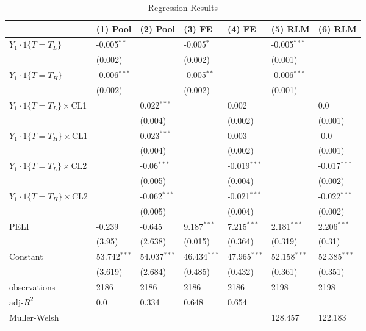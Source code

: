 \documentclass[12pt]{article}
\begin{document}
\begin{table}
    \caption{Regression Results}
    \vspace*{12pt}
    \centering

      \begin{tabular}{lllllll}
\hline
 & (1) Pool & (2) Pool & (3) FE & (4) FE & (5) RLM & (6) RLM \\
\hline
$Y_1\cdot1\{T=T_L\}$ & -0.005$^{**}$ &  & -0.005$^{*}$ &  & -0.005$^{***}$ &  \\
 & (0.002) &  & (0.002) &  & (0.001) &  \\
$Y_1\cdot1\{T=T_H\}$ & -0.006$^{***}$ &  & -0.005$^{**}$ &  & -0.006$^{***}$ &  \\
 & (0.002) &  & (0.002) &  & (0.001) &  \\
$Y_1\cdot1\{T=T_L\}\times$CL1 &  & 0.022$^{***}$ &  & 0.002 &  & 0.0 \\
 &  & (0.004) &  & (0.002) &  & (0.001) \\
$Y_1\cdot1\{T=T_H\}\times$CL1 &  & 0.023$^{***}$ &  & 0.003 &  & -0.0 \\
 &  & (0.004) &  & (0.002) &  & (0.001) \\
$Y_1\cdot1\{T=T_L\}\times$CL2 &  & -0.06$^{***}$ &  & -0.019$^{***}$ &  & -0.017$^{***}$ \\
 &  & (0.005) &  & (0.004) &  & (0.002) \\
$Y_1\cdot1\{T=T_H\}\times$CL2 &  & -0.062$^{***}$ &  & -0.021$^{***}$ &  & -0.022$^{***}$ \\
 &  & (0.005) &  & (0.004) &  & (0.002) \\
PELI & -0.239 & -0.645 & 9.187$^{***}$ & 7.215$^{***}$ & 2.181$^{***}$ & 2.206$^{***}$ \\
 & (3.95) & (2.638) & (0.015) & (0.364) & (0.319) & (0.31) \\
Constant & 53.742$^{***}$ & 54.037$^{***}$ & 46.434$^{***}$ & 47.965$^{***}$ & 52.158$^{***}$ & 52.385$^{***}$ \\
 & (3.619) & (2.684) & (0.485) & (0.432) & (0.361) & (0.351) \\\hline

observations & 2186 & 2186 & 2186 & 2186 & 2198 & 2198 \\
adj-$R^2$ & 0.0 & 0.334 & 0.648 & 0.654 &  &  \\
Muller-Welsh &  &  &  &  & 128.457 & 122.183 \\
\hline
\end{tabular}


\end{table}
\end{document}
